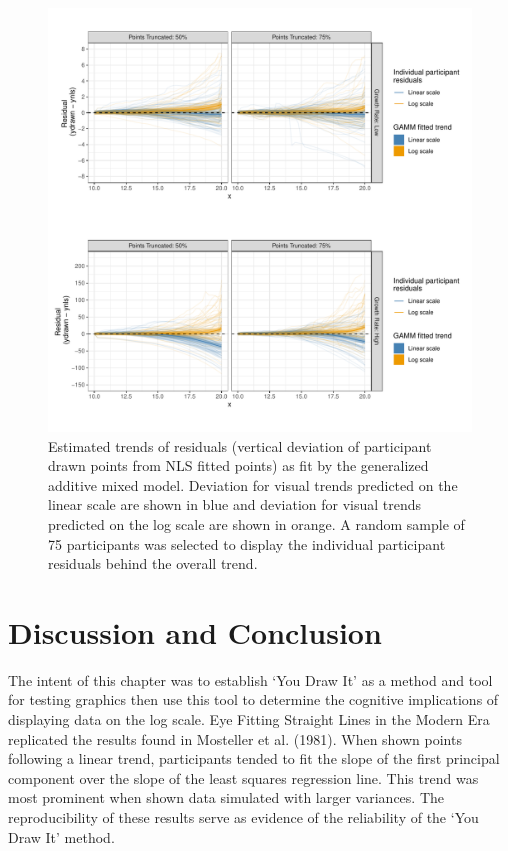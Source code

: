 \documentclass[print]{nuthesis}
\begin{document}
\begin{figure}[tbp]

{\centering \includegraphics[width=1\linewidth,]{thesis_files/figure-latex/exponential-prediction-gamm-preds-1} 

}

\caption[Exponential Prediction GAMM Results]{Estimated trends of residuals (vertical deviation of participant drawn points from NLS fitted points) as fit by the generalized additive mixed model. Deviation for visual trends predicted on the linear scale are shown in blue and deviation for visual trends predicted on the log scale are shown in orange. A random sample of 75 participants was selected to display the individual participant residuals behind the overall trend.}\label{fig:exponential-prediction-gamm-preds}
\end{figure}

\hypertarget{discussion-and-conclusion-1}{%
\section{Discussion and Conclusion}\label{discussion-and-conclusion-1}}

The intent of this chapter was to establish `You Draw It' as a method and tool for testing graphics then use this tool to determine the cognitive implications of displaying data on the log scale.
Eye Fitting Straight Lines in the Modern Era replicated the results found in Mosteller et al. (1981).
When shown points following a linear trend, participants tended to fit the slope of the first principal component over the slope of the least squares regression line.
This trend was most prominent when shown data simulated with larger variances.
The reproducibility of these results serve as evidence of the reliability of the `You Draw It' method.
\end{document}
